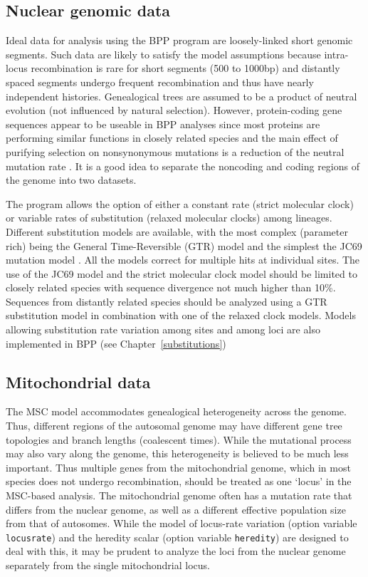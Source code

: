 \documentclass[a4paper]{book}
\numberwithin{equation}{section} \renewcommand{\baselinestretch}{0.55}
\begin{document}
\subsection{Nuclear genomic data}
Ideal data for analysis using the BPP program are loosely-linked short
genomic segments. Such data are likely to satisfy the model
assumptions because intra-locus recombination is rare for short
segments (500 to 1000bp) and distantly spaced segments undergo
frequent recombination and thus have nearly independent histories.
Genealogical trees are assumed to be a product of neutral evolution
(not influenced by natural selection).  However, protein-coding gene
sequences appear to be useable in \textsc{BPP} analyses since most
proteins are performing similar functions in closely related species
and the main effect of purifying selection on nonsynonymous mutations
is a reduction of the neutral mutation rate \citep{Shi2018,
  Thawornwattana2018MBE}.  It is a good idea to separate the noncoding
and coding regions of the genome into two datasets.

The program allows the option of either a constant rate (strict
molecular clock) or variable rates of substitution (relaxed molecular
clocks) among lineages. Different substitution models are available,
with the most complex (parameter rich) being the General
Time-Reversible (GTR) model and the simplest the JC69 mutation model
\citep{Jukes1969}. All the models correct for multiple hits at
individual sites.  The use of the JC69 model and the strict molecular
clock model should be limited to closely related species with sequence
divergence not much higher than 10\%. Sequences from distantly related
species should be analyzed using a GTR substitution model in
combination with one of the relaxed clock models.  Models allowing substitution
rate variation among sites and among loci are also implemented in BPP
(see Chapter~\ref{substitutions})

\subsection{Mitochondrial data}
The MSC model accommodates genealogical heterogeneity across the
genome. Thus, different regions of the autosomal genome may have
different gene tree topologies and branch lengths (coalescent times).
While the mutational process may also vary along the genome, this
heterogeneity is believed to be much less important.  Thus multiple
genes from the mitochondrial genome, which in most species does not
undergo recombination, should be treated as one ‘locus’ in the
MSC-based analysis.  The mitochondrial genome often has a mutation
rate that differs from the nuclear genome, as well as a different
effective population size from that of autosomes.  While the model of
locus-rate variation (option variable \texttt{locusrate}) and the
heredity scalar (option variable \texttt{heredity}) are designed to
deal with this, it may be prudent to analyze the loci from the nuclear
genome separately from the single mitochondrial locus.
\end{document}
